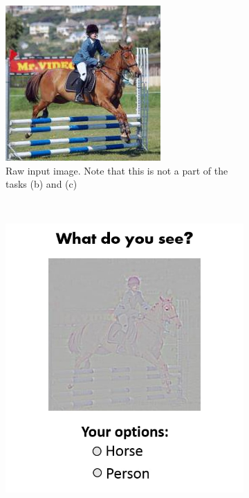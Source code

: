 \begin{figure}[ht]
    \centering
   \begin{subfigure}[b]{0.25\textwidth}
       \centering
       \includegraphics[width=0.55\linewidth]{figures/heval_1.jpg}
       \vspace{0.72in}
       \caption{\scriptsize{Raw input image. Note that this is not a part of the tasks (b) and (c)}}
		\label{fig:hs_clsdisc}
	\end{subfigure}
    \unskip\ \vrule\
   \hspace{0.05in}
    \begin{subfigure}[b]{0.25\textwidth}
        \centering
        \includegraphics[width=0.90\linewidth]{figures/heval_2.jpg}

\end{subfigure}
\end{figure}
